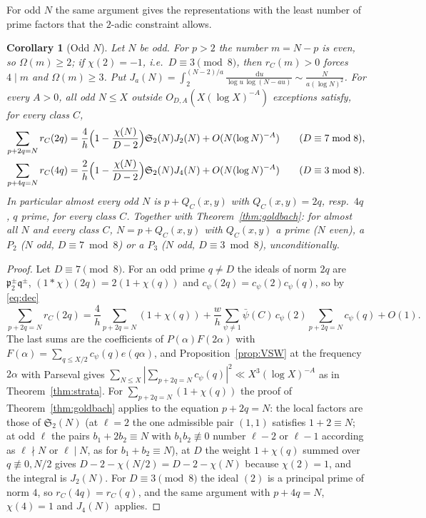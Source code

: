 ﻿\documentclass[11pt]{amsart}
\newtheorem{corollary}[theorem]{Corollary}
\theoremstyle{remark}
\newcommand{\sS}{\mathfrak S}
\newcommand{\dd}{\,\mathrm d}
\begin{document}
For odd $N$ the same argument gives the representations with the least number of prime factors that the $2$-adic constraint allows.

\begin{corollary}[Odd $N$]\label{cor:odd}
Let $N$ be odd. For $p>2$ the number $m=N-p$ is even, so $\Omega(m)\ge2$; if $\chi(2)=-1$, i.e.\ $D\equiv3\pmod8$, then $r_C(m)>0$ forces $4\mid m$ and $\Omega(m)\ge3$. Put $J_a(N)=\int_2^{(N-2)/a}\frac{\dd u}{\log u\,\log(N-au)}\sim\frac N{a(\log N)^2}$. For every $A>0$, all odd $N\le X$ outside $O_{D,A}(X(\log X)^{-A})$ exceptions satisfy, for every class $C$,
\begin{align*}
\sum_{p+2q=N}r_C(2q)&=\frac4h\Bigl(1-\frac{\chi(N)}{D-2}\Bigr)\sS_2(N)J_2(N)+O(N(\log N)^{-A})\qquad(D\equiv7\bmod8),\\
\sum_{p+4q=N}r_C(4q)&=\frac2h\Bigl(1-\frac{\chi(N)}{D-2}\Bigr)\sS_2(N)J_4(N)+O(N(\log N)^{-A})\qquad(D\equiv3\bmod8).
\end{align*}
In particular almost every odd $N$ is $p+Q_C(x,y)$ with $Q_C(x,y)=2q$, resp.\ $4q$, $q$ prime, for every class $C$. Together with Theorem~\ref{thm:goldbach}: for almost all $N$ and every class $C$, $N=p+Q_C(x,y)$ with $Q_C(x,y)$ a prime ($N$ even), a $P_2$ ($N$ odd, $D\equiv7\bmod8$) or a $P_3$ ($N$ odd, $D\equiv3\bmod8$), unconditionally.
\end{corollary}
\begin{proof}
Let $D\equiv7\pmod8$. For an odd prime $q\ne D$ the ideals of norm $2q$ are $\mathfrak p_2^{\pm}\mathfrak q^{\pm}$, $(1*\chi)(2q)=2(1+\chi(q))$ and $c_\psi(2q)=c_\psi(2)c_\psi(q)$, so by \eqref{eq:dec}
\[
\sum_{p+2q=N}r_C(2q)=\frac4h\sum_{p+2q=N}(1+\chi(q))+\frac wh\sum_{\psi\ne1}\bar\psi(C)\,c_\psi(2)\sum_{p+2q=N}c_\psi(q)+O(1).
\]
The last sums are the coefficients of $P(\alpha)F(2\alpha)$ with $F(\alpha)=\sum_{q\le X/2}c_\psi(q)e(q\alpha)$, and Proposition~\ref{prop:VSW} at the frequency $2\alpha$ with Parseval gives $\sum_{N\le X}|\sum_{p+2q=N}c_\psi(q)|^2\ll X^3(\log X)^{-A}$ as in Theorem~\ref{thm:strata}. For $\sum_{p+2q=N}(1+\chi(q))$ the proof of Theorem~\ref{thm:goldbach} applies to the equation $p+2q=N$: the local factors are those of $\sS_2(N)$ (at $\ell=2$ the one admissible pair $(1,1)$ satisfies $1+2\equiv N$; at odd $\ell$ the pairs $b_1+2b_2\equiv N$ with $b_1b_2\not\equiv0$ number $\ell-2$ or $\ell-1$ according as $\ell\nmid N$ or $\ell\mid N$, as for $b_1+b_2\equiv N$), at $D$ the weight $1+\chi(q)$ summed over $q\not\equiv0,N/2$ gives $D-2-\chi(N/2)=D-2-\chi(N)$ because $\chi(2)=1$, and the integral is $J_2(N)$. For $D\equiv3\pmod8$ the ideal $(2)$ is a principal prime of norm $4$, so $r_C(4q)=r_C(q)$, and the same argument with $p+4q=N$, $\chi(4)=1$ and $J_4(N)$ applies.
\end{proof}
\end{document}

